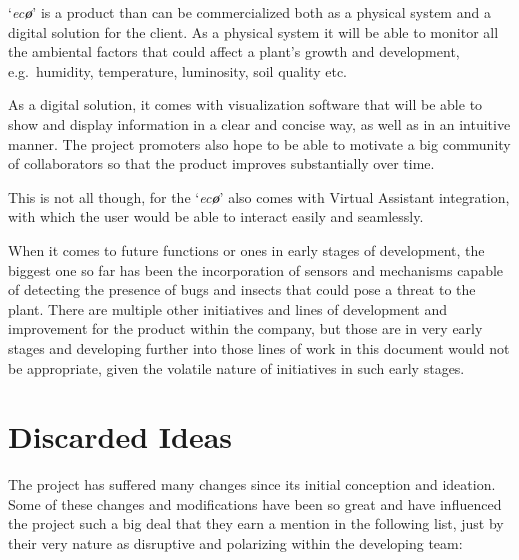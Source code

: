 \documentclass[english,runningheads,a4paper]{llncs}[2018/03/10]
\begin{document}
`\textit{ec\textbf{\o}}' is a product than can be commercialized both as a
physical system and a digital solution for the client. As a physical system it
will be able to monitor all the ambiental factors that could affect a plant's
growth and development, e.g.\ humidity, temperature, luminosity, soil quality
etc.

As a digital solution, it comes with visualization software that will be able to
show and display information in a clear and concise way, as well as in an
intuitive manner. The project promoters also hope to be able to motivate a big
community of collaborators so that the product improves substantially over time.

This is not all though, for the `\textit{ec\textbf{\o}}' also comes with Virtual
Assistant integration, with which the user would be able to interact easily and
seamlessly.

When it comes to future functions or ones in early stages of development, the
biggest one so far has been the incorporation of sensors and mechanisms capable
of detecting the presence of bugs and insects that could pose a threat to the
plant. There are multiple other initiatives and lines of development and
improvement for the product within the company, but those are in very early
stages and developing further into those lines of work in this document would
not be appropriate, given the volatile nature of initiatives in such early
stages.


\section*{Discarded Ideas}

The project has suffered many changes since its initial conception and ideation.
Some of these changes and modifications have been so great and have influenced
the project such a big deal that they earn a mention in the following list, just
by their very nature as disruptive and polarizing within the developing team:
\end{document}
